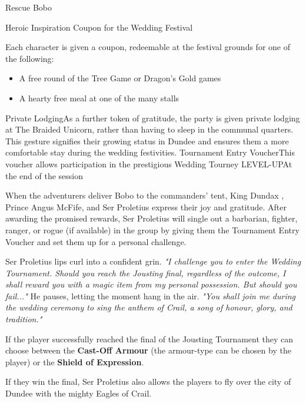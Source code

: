 \begin{DndQuestHook}[width=0.5\textwidth - 4pt]{Rescue Bobo}
	{%
		{Heroic Inspiration}{}%
		{Coupon for the Wedding Festival}{%
			Each character is given a coupon, redeemable at the festival grounds for one of the following:
			\begin{itemize}
				\item A free round of the Tree Game or Dragon's Gold games
				\item A hearty free meal at one of the many stalls
			\end{itemize}
		}%
		{Private Lodging}{As a further token of gratitude, the party is given private lodging at The Braided Unicorn, rather than having to sleep in the communal quarters. This gesture signifies their growing status in Dundee and ensures them a more comfortable stay during the wedding festivities.}
		{Tournament Entry Voucher}{This voucher allows participation in the prestigious Wedding Tourney}%
		{LEVEL-UP}{At the end of the session}
	}%
\end{DndQuestHook}
	
{\entryfont\noindent When the adventurers deliver Bobo to the commanders' tent, King Dundax , Prince Angus McFife, and Ser Proletius express their joy and gratitude. After awarding the promised rewards, Ser Proletius will single out a barbarian, fighter, ranger, or rogue (if available) in the group by giving them the Tournament Entry Voucher and set them up for a personal challenge.}

\begin{DndReadAloud}
	Ser Proletius lips curl into a confident grin. \textit{"I challenge you to enter the Wedding Tournament. Should you reach the Jousting final, regardless of the outcome, I shall reward you with a magic item from my personal possession. But should you fail..."} He pauses, letting the moment hang in the air. \textit{"You shall join me during the wedding ceremony to sing the anthem of Crail, a song of honour, glory, and tradition."}
\end{DndReadAloud}

{\entryfont\noindent If the player successfully reached the final of the Jousting Tournament they can choose between the \textbf{Cast-Off Armour} (the armour-type can be chosen by the player) or the \textbf{Shield of Expression}.

If they win the final, Ser Proletius also allows the players to fly over the city of Dundee with the mighty Eagles of Crail.}

